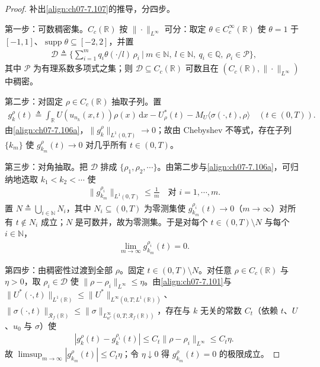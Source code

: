 \documentclass[../../main.tex]{subfiles}%
\begin{document}
\begin{proof}
补出\eqref{align:ch07-7.107}的推导，分四步。

第一步：可数稠密集。$C_c(\mathbb{R})$ 按 $\|\cdot\|_{L^\infty}$ 可分：取定 $\theta\in C_c^\infty(\mathbb{R})$ 使 $\theta=1$ 于 $[-1,1]$、$\operatorname{supp}\theta\subseteq[-2,2]$，并置
\begin{align*}
\mathcal{D}\triangleq\Big\{\sum_{i=1}^{m}q_i\theta(\cdot/l)\,\rho_i\ \Big|\ m\in\mathbb{N},\ l\in\mathbb{N},\ q_i\in\mathbb{Q},\ \rho_i\in\mathcal{P}\Big\},
\end{align*}
其中 $\mathcal{P}$ 为有理系数多项式之集；则 $\mathcal{D}\subseteq C_c(\mathbb{R})$ 可数且在 $(C_c(\mathbb{R}),\|\cdot\|_{L^\infty})$ 中稠密。

第二步：对固定 $\rho\in C_c(\mathbb{R})$ 抽取子列。置
\begin{align*}
g_k^\rho(t)\triangleq\int_{\mathbb{R}}U(u_{n_k}(x,t))\rho(x)\,\mathrm{d}x-U_\rho^*(t)-M_U\langle\sigma(\cdot,t),\rho\rangle
\quad(t\in(0,T)).
\end{align*}
由\eqref{align:ch07-7.106a}，$\|g_k^\rho\|_{L^1(0,T)}\to0$；故由 Chebyshev 不等式，存在子列 $\{k_m\}$ 使 $g_{k_m}^\rho(t)\to0$ 对几乎所有 $t\in(0,T)$。

第三步：对角抽取。把 $\mathcal{D}$ 排成 $\{\rho_1,\rho_2,\cdots\}$。由第二步与\eqref{align:ch07-7.106a}，可归纳地选取 $k_1<k_2<\cdots$ 使
\begin{align*}
\|g_{k_m}^{\rho_i}\|_{L^1(0,T)}\leqslant\frac1m\quad\text{对 }i=1,\cdots,m.
\end{align*}
置 $N\triangleq\bigcup_{i\in\mathbb{N}}N_i$，其中 $N_i\subseteq(0,T)$ 为零测集使 $g_{k_m}^{\rho_i}(t)\to0$（$m\to\infty$）对所有 $t\notin N_i$ 成立；$N$ 是可数并，故为零测集。于是对每个 $t\in(0,T)\setminus N$ 与每个 $i\in\mathbb{N}$，
\begin{align*}
\lim_{m\to\infty}g_{k_m}^{\rho_i}(t)=0.
\end{align*}

第四步：由稠密性过渡到全部 $\rho$。固定 $t\in(0,T)\setminus N$。对任意 $\rho\in C_c(\mathbb{R})$ 与 $\eta>0$，取 $\rho_i\in\mathcal{D}$ 使 $\|\rho-\rho_i\|_{L^\infty}\leqslant\eta$。由\eqref{align:ch07-7.101}与 $\|U^*(\cdot,t)\|_{L^1(\mathbb{R})}\leqslant\|U^*\|_{L^\infty(0,T;L^1(\mathbb{R}))}$、$\|\sigma(\cdot,t)\|_{\mathscr{R}_f(\mathbb{R})}\leqslant\|\sigma\|_{L^\infty_{w^*}(0,T;\mathscr{R}_f(\mathbb{R}))}$，存在与 $k$ 无关的常数 $C_t$（依赖 $t$、$U$、$u_0$ 与 $\sigma$）使
\begin{align*}
|g_k^\rho(t)-g_k^{\rho_i}(t)|\leqslant C_t\|\rho-\rho_i\|_{L^\infty}\leqslant C_t\eta.
\end{align*}
故 $\limsup_{m\to\infty}|g_{k_m}^\rho(t)|\leqslant C_t\eta$；令 $\eta\downarrow0$ 得 $g_{k_m}^\rho(t)=0$ 的极限成立。


\end{proof}
\end{document}
